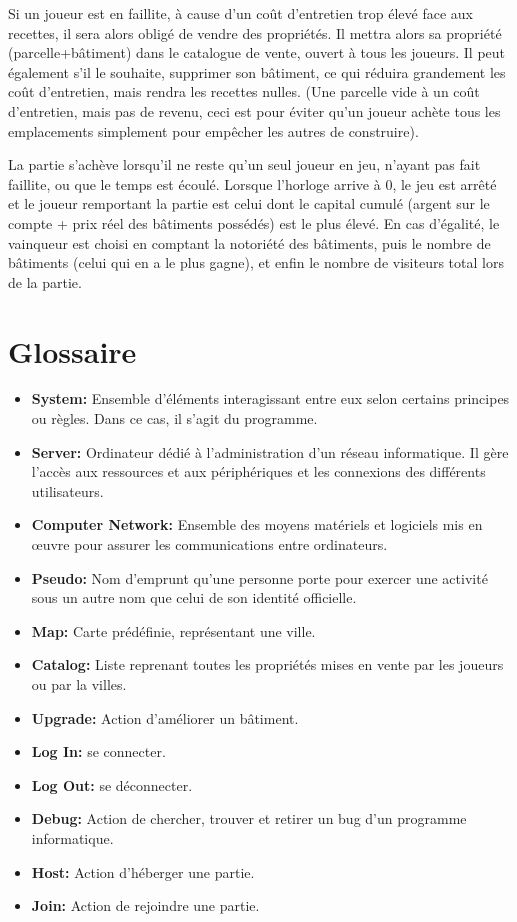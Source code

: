\documentclass[a4paper,11pt]{report}
\begin{document}
Si un joueur est en faillite, à cause d'un coût d'entretien trop élevé face aux recettes, il sera alors obligé de vendre des propriétés. Il mettra alors sa propriété (parcelle+bâtiment) dans le catalogue de vente, ouvert à tous les joueurs.
Il peut également s'il le souhaite, supprimer son bâtiment, ce qui réduira grandement les coût d'entretien, mais rendra les recettes nulles. (Une parcelle vide à un coût d'entretien, mais pas de revenu, ceci est pour éviter qu'un joueur achète tous les emplacements simplement pour empêcher les autres de construire).

La partie s'achève lorsqu'il ne reste qu'un seul joueur en jeu, n'ayant pas fait faillite, ou que le temps est écoulé. Lorsque l'horloge arrive à 0, le jeu est arrêté et le joueur remportant la partie est celui dont le capital cumulé (argent sur le compte + prix réel des bâtiments possédés) est le plus élevé. En cas d'égalité, le vainqueur est choisi en comptant la notoriété des bâtiments, puis le nombre de bâtiments (celui qui en a le plus gagne), et enfin le nombre de visiteurs total lors de la partie.

\newpage
\section{Glossaire}
\begin{itemize}
 \item \textbf{System:} Ensemble d'éléments interagissant entre eux selon certains principes ou règles. Dans ce cas, il s’agit du programme.
 \item \textbf{Server:} Ordinateur dédié à l'administration d'un réseau informatique. Il gère l'accès aux ressources et aux périphériques et les connexions des différents utilisateurs.
 \item \textbf{Computer Network:} Ensemble des moyens matériels et logiciels mis en œuvre pour assurer les communications entre ordinateurs.
 \item \textbf{Pseudo:} Nom d'emprunt qu'une personne porte pour exercer une activité sous un autre nom que celui de son identité officielle.
 \item \textbf{Map:} Carte prédéfinie, représentant une ville.
 \item \textbf{Catalog:} Liste reprenant toutes les propriétés mises en vente par les joueurs ou par la villes.
 \item \textbf{Upgrade:} Action d'améliorer un bâtiment.
 \item \textbf{Log In:} se connecter.
 \item \textbf{Log Out:} se déconnecter.
 \item \textbf{Debug:} Action de chercher, trouver et retirer un bug d’un programme informatique.
 \item \textbf{Host:} Action d'héberger une partie.
 \item \textbf{Join:} Action de rejoindre une partie.
\end{itemize}
\end{document}
